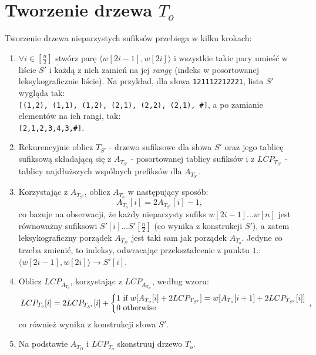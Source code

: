 \documentclass[a4paper,oneside,10pt]{book}
\begin{document}
    \section*{Tworzenie drzewa $T_o$}
    Tworzenie drzewa nieparzystych sufiksów przebiega w kilku krokach:
    \begin{enumerate}
     \item $\forall i \in [\frac{n}{2}]$ stwórz parę $\langle w[2i-1], w[2i] \rangle$ i wszystkie takie pary umieść w liście $S'$ i każdą z nich zamień na jej \textit{rangę} (indeks w posortowanej leksykograficznie liście). Na przykład, dla słowa \verb|121112212221|, lista $S'$ wygląda tak: \\
     \verb|[(1,2), (1,1), (1,2), (2,1), (2,2), (2,1), #]|, a po zamianie elementów na ich rangi, tak: \\
     \verb|[2,1,2,3,4,3,#]|.
     \item Rekurencyjnie oblicz $T_{S'}$ - drzewo sufiksowe dla słowa $S'$ oraz jego tablicę sufiksową składającą się z $A_{T_{S'}}$ - posortowanej tablicy sufiksów i z $LCP_{T_{S'}}$ - tablicy najdłuższych wspólnych prefiksów dla $A_{T_{S'}}$.
     \item Korzystając z $A_{T_{S'}}$, oblicz $A_{T_o}$ w następujący sposób:
     $$
        A_{T_o}[i] = 2A_{T_{S'}}[i] - 1,
     $$
     co bazuje na obserwacji, że każdy nieparzysty sufiks $w[2i-1]...w[n]$ jest równoważny sufiksowi $S'[i]...S'[\frac{n}{2}]$ (co wynika z konstrukcji $S'$), a zatem leksykograficzny porządek $A_{T_{S'}}$ jest taki sam jak porządek $A_{T_o}$. Jedyne co trzeba zmienić, to indeksy, odwracając przekształcenie z punktu $1.$: $\langle w[2i-1],w[2i] \rangle \rightarrow S'[i]$.
     \item Oblicz $LCP_{A_{T_o}}$, korzystając z $LCP_{A_{T_{S'}}}$, według wzoru:
      \begin{align*}
      \left.
       LCP_{T_o}[i] = 2LCP_{T_{S'}}[i] + \bigg\{
       \begin{array}{@{}l}
        1 \text{ if } w[A_{T_o}[i] + 2LCP_{T_{S'}}] = w[A_{T_o}[i+1] + 2LCP_{T_{S'}}[i]]   \\
        0 \text{ otherwise}
       \end{array},
        \right.              
      \end{align*}
      co również wynika z konstrukcji słowa $S'$.
    \item Na podstawie $A_{T_O}$ i $LCP_{T_o}$ skonstruuj drzewo $T_o$.
    \end{enumerate}
\end{document}
